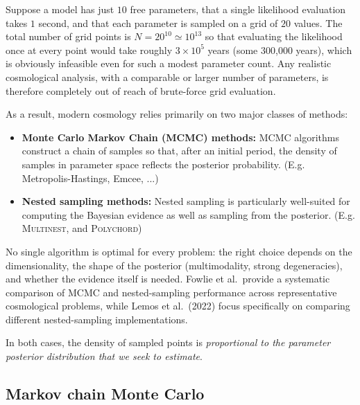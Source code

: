 Suppose a model has just $10$ free parameters, that a single likelihood evaluation takes $1$ second, and that each parameter is sampled on a grid of $20$ values. The total number of grid points is $N = 20^{10} \simeq 10^{13}$ so that evaluating the likelihood once at every point would take roughly $3\times10^5$ years (some 300{,}000 years), which is obviously infeasible even for such a modest parameter count. Any realistic cosmological analysis, with a comparable or larger number of parameters, is therefore completely out of reach of brute-force grid evaluation.

\smallskip

As a result, modern cosmology relies primarily on two major classes of methods:
\begin{itemize}
    \item \textbf{Monte Carlo Markov Chain (MCMC) 
    methods:} MCMC algorithms construct a 
    chain of samples so that, after an initial 
    period, the density of samples in parameter space 
    reflects the posterior probability. (E.g. Metropolis-Hastings, Emcee, ...)
    \item \textbf{Nested sampling methods:}  Nested sampling is particularly well-suited for computing the Bayesian evidence as well as sampling from the posterior. (E.g. \textsc{Multinest}, and \textsc {Polychord})
\end{itemize}

\begin{tipsblock}
No single algorithm is optimal for every problem: the right choice depends on the dimensionality, the shape of the posterior (multimodality, strong degeneracies), and whether the evidence itself is needed. Fowlie et al.\ provide a systematic comparison of MCMC and nested-sampling performance across representative cosmological problems, while Lemos et al.\ (2022) focus specifically on comparing different nested-sampling implementations.
\end{tipsblock}

In both cases, the density of sampled points is 
\textit{proportional to the parameter posterior 
distribution that we seek to estimate}.

\subsection{Markov chain Monte Carlo}
\label{sec:mcmc}

\vspace{-1em}

